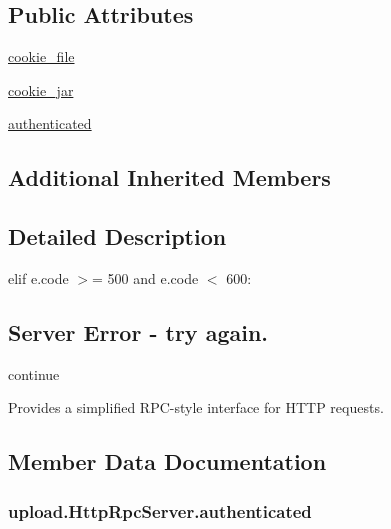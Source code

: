 \subsection*{Public Attributes}
\begin{DoxyCompactItemize}
\item 
\hyperlink{classupload_1_1_http_rpc_server_ad5c1a730c030f9d3b5f70c2e0d8b9a1d}{cookie\+\_\+file}
\item 
\hyperlink{classupload_1_1_http_rpc_server_a1b9c9af7f0a46afd84a9d524782323bf}{cookie\+\_\+jar}
\item 
\hyperlink{classupload_1_1_http_rpc_server_aaa356e2491537dd0d4bfc5b1bb0fec96}{authenticated}
\end{DoxyCompactItemize}
\subsection*{Additional Inherited Members}


\subsection{Detailed Description}
elif e.\+code $>$= 500 and e.\+code $<$ 600\+: \subsection*{Server Error -\/ try again.}

continue \begin{DoxyVerb}Provides a simplified RPC-style interface for HTTP requests.\end{DoxyVerb}
 

\subsection{Member Data Documentation}
\subsubsection[{\texorpdfstring{authenticated}{authenticated}}]{\setlength{\rightskip}{0pt plus 5cm}upload.\+Http\+Rpc\+Server.\+authenticated}\hypertarget{classupload_1_1_http_rpc_server_aaa356e2491537dd0d4bfc5b1bb0fec96}{}\label{classupload_1_1_http_rpc_server_aaa356e2491537dd0d4bfc5b1bb0fec96}
